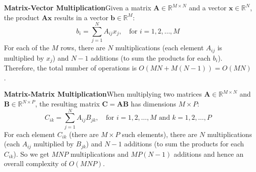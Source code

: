 \textbf{Matrix-Vector Multiplication}\quad Given a matrix $ \mathbf{A} \in \mathbb{R}^{M \times N} $ and a vector $ \mathbf{x} \in \mathbb{R}^N $, the product $ \mathbf{A}\mathbf{x} $ results in a vector $ \mathbf{b} \in \mathbb{R}^M $:
\begin{equation*}
    b_i = \sum_{j=1}^{N} A_{ij} x_j, \quad \text{for } i = 1, 2, \dots, M
\end{equation*}
For each of the $ M $ rows, there are $ N $ multiplications (each element $ A_{ij} $ is multiplied by $ x_j $) and $ N - 1 $ additions (to sum the products for each $ b_i $). Therefore, the total number of operations is $ O(MN + M(N - 1)) = O(MN) $.

\textbf{Matrix-Matrix Multiplication}\quad When multiplying two matrices $ \mathbf{A} \in \mathbb{R}^{M \times N} $ and $ \mathbf{B} \in \mathbb{R}^{N \times P} $, the resulting matrix $ \mathbf{C} = \mathbf{A}\mathbf{B} $ has dimensions $ M \times P $:
\begin{equation*}
    C_{ik} = \sum_{j=1}^{N} A_{ij} B_{jk}, \quad \text{for } i = 1, 2, \dots, M \text{ and } k = 1, 2, \dots, P
\end{equation*}
For each element $ C_{ik} $ (there are $ M \times P $ such elements), there are $ N $ multiplications (each $ A_{ij} $ multiplied by $ B_{jk} $) and $ N - 1 $ additions (to sum the products for each $ C_{ik} $). So we get $MNP$ multiplications and $MP(N-1)$ additions and hence an overall complexity of $O(MNP)$.


